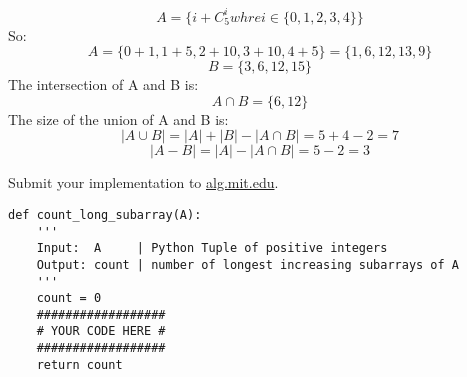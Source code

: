 \documentclass[12pt,twoside]{article}
\begin{document}

\begin{problems}

\problem  %

\begin{problemparts}
\problempart %
\[
A = \{i + C_5^i whre i \in \{0,1,2,3,4\}\}
\]
So:
\[
A = \{0 + 1, 1 + 5, 2 + 10, 3 + 10, 4 + 5\} = \{1, 6, 12, 13, 9\}
\]
\[
B = \{3, 6, 12, 15\}
\]
The intersection of A and B is:
\[
A \cap B = \{6, 12\}
\]
\problempart %
The size of the union of A and B is:
\[
|A \cup B| = |A| + |B| - |A \cap B| = 5 + 4 - 2 = 7
\]
\problempart %
\[
|A-B| = |A| - |A \cap B| = 5 - 2 = 3
\]
\end{problemparts}

\problem  %

\begin{problemparts}
\problempart %

\problempart %
\problempart %
\end{problemparts}

\problem  %

\begin{problemparts}
\problempart %
\problempart %
\problempart %
\end{problemparts}

\problem  %

\newpage
\problem  %

\vfill
\problem  %
Submit your implementation to {\small\url{alg.mit.edu}}.

\begin{lstlisting}
def count_long_subarray(A):
    '''
    Input:  A     | Python Tuple of positive integers
    Output: count | number of longest increasing subarrays of A
    '''
    count = 0
    ##################
    # YOUR CODE HERE #
    ##################
    return count
\end{lstlisting}

\end{problems}
\end{document}
